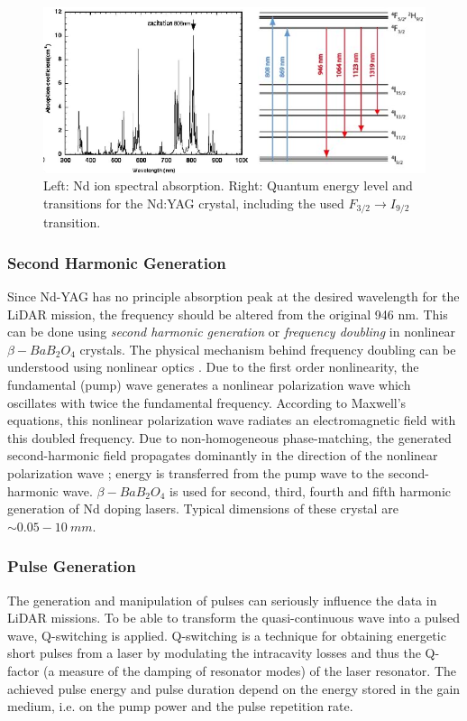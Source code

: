 \begin{figure} [ht]
\centering
\includegraphics[scale=0.7]{chapters/img/laser_line.png}	
\caption{Left: Nd ion spectral absorption. Right: Quantum energy level and transitions for the Nd:YAG crystal, including the used $F_{3/2}\rightarrow I_{9/2}$ transition. }
\label{laser}
\end{figure}

\subsubsection{Second Harmonic Generation}
\label{SHG}
Since Nd-YAG has no principle absorption peak at the desired wavelength for the \acs{LiDAR} mission, the frequency should be altered from the original 946 nm. This can be done using \textit{second harmonic generation} or \textit{frequency doubling} in nonlinear $\beta-BaB_{2}O_{4}$ crystals. The physical mechanism behind frequency doubling can be understood using nonlinear optics \cite{lasertech}. Due to the first order nonlinearity, the fundamental (pump) wave generates a nonlinear polarization wave which oscillates with twice the fundamental frequency. According to Maxwell's equations, this nonlinear polarization wave radiates an electromagnetic field with this doubled frequency. Due to non-homogeneous phase-matching, the generated second-harmonic field propagates dominantly in the direction of the nonlinear polarization wave \cite{algaasdiodes}; energy is transferred from the pump wave to the second-harmonic wave. $\beta-BaB_{2}O_{4}$ is used for second, third, fourth and fifth harmonic generation of Nd doping \acp{laser}. Typical dimensions of these crystal are $\sim0.05 - 10\ mm$.

\subsubsection{Pulse Generation}
\label{pockel}
The generation and manipulation of pulses can seriously influence the data in \acs{LiDAR} missions. To be able to transform the quasi-continuous wave into a pulsed wave, Q-switching is applied. Q-switching is a technique for obtaining energetic short pulses from a \acs{laser} by modulating the intracavity losses and thus the Q-factor (a measure of the damping of resonator modes) of the laser resonator. The achieved pulse energy and pulse duration depend on the energy stored in the gain medium, i.e. on the pump power and the pulse repetition rate.

